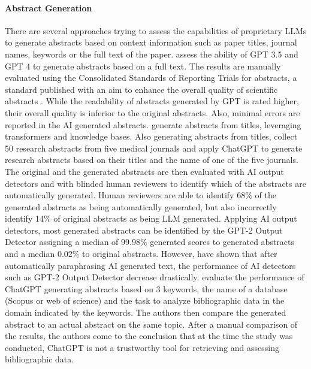 \paragraph{Abstract Generation}
There are several approaches trying to assess the capabilities of proprietary LLMs to generate abstracts based on context information such as paper titles, journal names, keywords or the full text of the paper. \citet{hwang2024can} assess the ability of GPT 3.5 and GPT 4 to generate abstracts based on a full text. The results are manually evaluated using the Consolidated Standards of Reporting Trials for abstracts, a standard published with an aim to enhance the overall quality of scientific abstracts \cite{hopewell2008consort}. 
While the readability of abstracts generated by GPT is rated higher, their overall quality is inferior to the original abstracts. Also, minimal errors are reported in the AI generated abstracts. %
\citet{wang-etal-2019-paperrobot} generate abstracts from titles, leveraging transformers and knowledge bases. Also generating abstracts from titles, \citet{gao2023comparing} collect 50 research abstracts from five medical journals and apply ChatGPT to generate research abstracts based on their titles and the name of one of the five journals. The original and the generated abstracts are then evaluated with AI output detectors and with blinded human reviewers to identify which of the abstracts are automatically generated. Human reviewers are able to identify 68\% of the generated abstracts as being automatically generated, but also incorrectly identify 14\% of original abstracts as being LLM generated.  
Applying AI output detectors, most generated abstracts can be identified by the GPT-2 Output Detector assigning a median of 99.98\% generated scores to generated abstracts and a median 0.02\% to original abstracts. 
However, \citet{anderson2023ai} have shown that after automatically paraphrasing AI generated text, the performance of AI detectors such as GPT-2 Output Detector decrease drastically. 
\citet{farhat2023trustworthy} evaluate the performance of ChatGPT generating abstracts based on 3 keywords, the name of a database (Scopus or web of science) and the task to analyze bibliographic data  in the domain indicated by the keywords. %
The authors then compare the generated abstract to an actual abstract on the same topic. %
After a manual comparison of the results, the authors come to the conclusion that at the time the study was conducted, ChatGPT is not a trustworthy tool for retrieving and assessing bibliographic data. %

